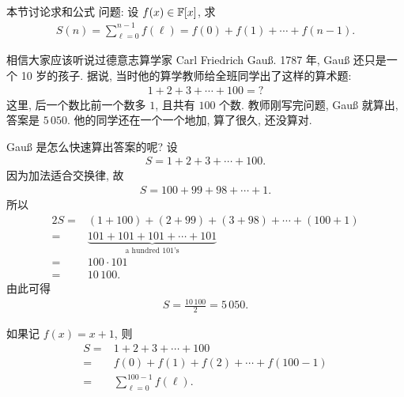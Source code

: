 \subsection*{\SummationFormulae}
\markright{\SummationFormulae}

本节讨论求和公式  问题: 设 $f(x) \in \mathbb{F}[x]$, 求
\begin{align*}
    S(n) = \sum_{\ell = 0}^{n - 1} f(\ell) = f(0) + f(1) + \cdots + f(n - 1).
\end{align*}

\begin{example}
    相信大家应该听说过德意志算学家 Carl Friedrich Gauß. 1787 年, Gauß 还只是一个 10 岁的孩子. 据说, 当时他的算学教师给全班同学出了这样的算术题:
    \begin{align*}
        1 + 2 + 3 + \cdots + 100 = ?
    \end{align*}
    这里, 后一个数比前一个数多 $1$, 且共有 $100$ 个数. 教师刚写完问题, Gauß 就算出, 答案是 $5\,050$. 他的同学还在一个一个地加, 算了很久, 还没算对.

    Gauß 是怎么快速算出答案的呢? 设
    \begin{align*}
        S = 1 + 2 + 3 + \cdots + 100.
    \end{align*}
    因为加法适合交换律, 故
    \begin{align*}
        S = 100 + 99 + 98 + \cdots + 1.
    \end{align*}
    所以
    \begin{align*}
        2S
        = {} & (1 + 100) + (2 + 99) + (3 + 98) + \cdots + (100 + 1) \\
        = {} & \underbrace{101 + 101 + 101 + \cdots + 101}
        _{\text{a hundred $101$'s}}                                 \\
        = {} & 100 \cdot 101                                        \\
        = {} & 10\,100.
    \end{align*}
    由此可得
    \begin{align*}
        S = \frac{10\,100}{2} = 5\,050.
    \end{align*}

    如果记 $f(x) = x + 1$, 则
    \begin{align*}
        S
        = {} & 1 + 2 + 3 + \cdots + 100                 \\
        = {} & f(0) + f(1) + f(2) + \cdots + f(100 - 1) \\
        = {} & \sum_{\ell = 0}^{100 - 1} f(\ell).
    \end{align*}


\end{example}

